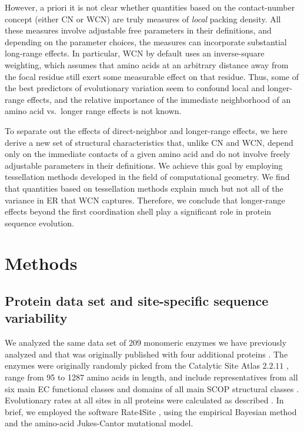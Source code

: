 \documentclass[12pt]{article}
\begin{document}
However, a priori it is not clear whether quantities based on the contact-number concept (either CN or WCN) are truly measures of \emph{local} packing density. All these measures involve adjustable free parameters in their definitions, and depending on the parameter choices, the measures can incorporate substantial long-range effects. In particular, WCN by default uses an inverse-square weighting, which assumes that amino acids at an arbitrary distance away from the focal residue still exert some measurable effect on that residue. Thus, some of the best predictors of evolutionary variation seem to confound local and longer-range effects, and the relative importance of the immediate neighborhood of an amino acid vs.\ longer range effects is not known.    
    
To separate out the effects of direct-neighbor and longer-range effects, we here derive a new set of structural characteristics that, unlike CN and WCN, depend only on the immediate contacts of a given amino acid and do not involve freely adjustable parameters in their definitions. We achieve this goal by employing tessellation methods developed in the field of computational geometry. We find that quantities based on tessellation methods explain much but not all of the variance in ER that WCN captures. Therefore, we conclude that longer-range effects beyond the first coordination shell play a significant role in protein sequence evolution.
    
\section*{Methods}
    
\subsection*{Protein data set and site-specific sequence variability}

We analyzed the same data set of 209 monomeric enzymes we have previously analyzed \cite{echave_relationship_2014} and that was originally published with four additional proteins \cite{yeh_site-specific_2014}. The enzymes were originally randomly picked from the Catalytic Site Atlas $2.2.11$ \cite{porter_catalytic_2004}, range from 95 to 1287 amino acids in length, and include representatives from all six main EC functional classes \cite{webb_enzyme_1992} and domains of all main SCOP structural classes \cite{murzin_scop:_1995}. Evolutionary rates at all sites in all proteins were calculated as described \cite{echave_relationship_2014}. In brief, we employed the software Rate4Site \cite{mayrose_comparison_2004}, using the empirical Bayesian method and the amino-acid Jukes-Cantor mutational model.
  
\end{document}
